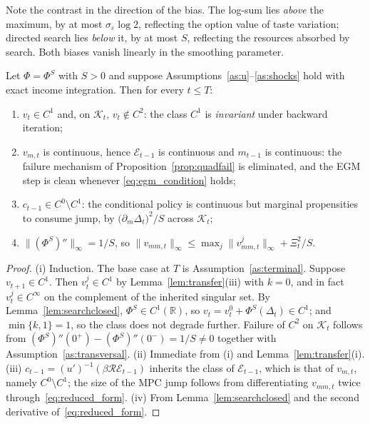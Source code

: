 Note the contrast in the direction of the bias. The log-sum lies \emph{above} the
maximum, by at most $\sigma_\varepsilon\log 2$, reflecting the option value of taste
variation; directed search lies \emph{below} it, by at most $S$, reflecting the
resources absorbed by search. Both biases vanish linearly in the smoothing parameter.

\begin{proposition}
\label{prop:search}
Let $\Phi=\Phi^{S}$ with $S>0$ and suppose
Assumptions~\ref{as:u}--\ref{as:shocks} hold with exact income integration. Then for
every $t\le T$:
\begin{enumerate}
    \item $v_t\in C^{1}$ and, on $\mathcal{K}_t$, $v_t\notin C^{2}$: the class $C^{1}$
    is \emph{invariant} under backward iteration;
    \item $v_{m,t}$ is continuous, hence $\mathcal{E}_{t-1}$ is continuous and
    $m_{t-1}$ is continuous: the failure mechanism of
    Proposition~\ref{prop:quadfail} is eliminated, and the EGM step is clean whenever
    \eqref{eq:egm_condition} holds;
    \item $c_{t-1}\in C^{0}\setminus C^{1}$: the conditional policy is continuous but
    marginal propensities to consume jump, by
    $\big(\partial_m\Delta_t\big)^{2}/S$ across $\mathcal{K}_t$;
    \item $\|(\Phi^{S})''\|_{\infty}=1/S$, so
    $\|v_{mm,t}\|_{\infty}\le\max_j\|v_{mm,t}^{j}\|_{\infty}+\Xi_t^{2}/S$.
\end{enumerate}
\end{proposition}

\begin{proof}
(i) Induction. The base case at $T$ is Assumption~\ref{as:terminal}. Suppose
$v_{t+1}\in C^{1}$. Then $v_t^{j}\in C^{1}$ by Lemma~\ref{lem:transfer}(iii) with
$k=0$, and in fact $v_t^{j}\in C^{\infty}$ on the complement of the inherited singular
set. By Lemma~\ref{lem:searchclosed}, $\Phi^{S}\in C^{1}(\mathbb{R})$, so
$v_t=v_t^{0}+\Phi^{S}(\Delta_t)\in C^{1}$; and $\min\{k,1\}=1$, so the class does not
degrade further. Failure of $C^{2}$ on $\mathcal{K}_t$ follows from
$(\Phi^{S})''(0^{+})-(\Phi^{S})''(0^{-})=1/S\neq0$ together with
Assumption~\ref{as:transversal}. (ii) Immediate from (i) and
Lemma~\ref{lem:transfer}(i). (iii) $c_{t-1}=(u')^{-1}(\beta\mathcal{R}\mathcal{E}_{t-1})$
inherits the class of $\mathcal{E}_{t-1}$, which is that of $v_{m,t}$, namely
$C^{0}\setminus C^{1}$; the size of the MPC jump follows from differentiating
$v_{mm,t}$ twice through~\eqref{eq:reduced_form}. (iv) From
Lemma~\ref{lem:searchclosed} and the second derivative of~\eqref{eq:reduced_form}.
\end{proof}

